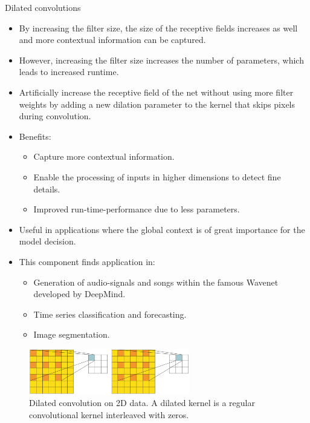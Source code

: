 \begin{vbframe}{Dilated convolutions}
\framebreak 

\begin{itemize}
        \item By increasing the filter size, the size of the receptive fields increases as well and more contextual information can be captured.
        \item However, increasing the filter size increases the number of parameters, which leads to increased runtime. 
        \item Artificially increase the receptive field of the net without using more filter weights by adding a new dilation parameter to the kernel that skips pixels during convolution.
        \item Benefits:
        \begin{itemize}
            \item Capture more contextual information. 
            \item Enable the processing of inputs in higher dimensions to detect fine details. 
            \item Improved run-time-performance due to less parameters.
        \end{itemize}
    \end{itemize}

    \vspace*{-0.9cm}
 

\framebreak

\begin{itemize}
        \item Useful in applications where the global context is of great importance for the model decision.
        \item This component finds application in:
        \begin{itemize}
            \item Generation of audio-signals and songs within the famous Wavenet developed by DeepMind.
            \item Time series classification and forecasting.
            \item Image segmentation.
        \end{itemize}
    \end{itemize}

    \begin{figure}
        \centering
        \includegraphics[width=7cm]{figure/dilatedconv-7.png}
        \caption{Dilated convolution on 2D data. A dilated kernel is a regular convolutional kernel interleaved with zeros. } 
    \end{figure}



\end{vbframe}
